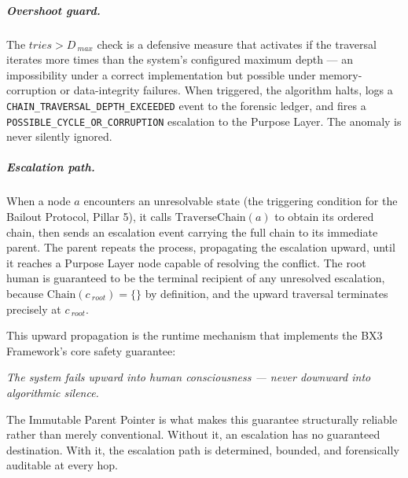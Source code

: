 \subparagraph{Overshoot guard.}
The $tries > D_{\ max}$ check is a defensive measure that activates if the traversal iterates more times than the system's configured maximum depth --- an impossibility under a correct implementation but possible under memory-corruption or data-integrity failures. When triggered, the algorithm halts, logs a \texttt{CHAIN\_TRAVERSAL\_DEPTH\_EXCEEDED} event to the forensic ledger, and fires a \texttt{POSSIBLE\_CYCLE\_OR\_CORRUPTION} escalation to the Purpose Layer. The anomaly is never silently ignored.

\subparagraph{Escalation path.}
When a node $a$ encounters an unresolvable state (the triggering condition for the Bailout Protocol, Pillar 5), it calls $\text{TraverseChain}(a)$ to obtain its ordered chain, then sends an escalation event carrying the full chain to its immediate parent. The parent repeats the process, propagating the escalation upward, until it reaches a Purpose Layer node capable of resolving the conflict. The root human is guaranteed to be the terminal recipient of any unresolved escalation, because $\text{Chain}(c_{\ root}) = \{\}$ by definition, and the upward traversal terminates precisely at $c_{\ root}$.

This upward propagation is the runtime mechanism that implements the BX3 Framework's core safety guarantee:

\begin{center}
\textit{The system fails upward into human consciousness --- never downward into algorithmic silence.}
\end{center}

The Immutable Parent Pointer is what makes this guarantee structurally reliable rather than merely conventional. Without it, an escalation has no guaranteed destination. With it, the escalation path is determined, bounded, and forensically auditable at every hop.
